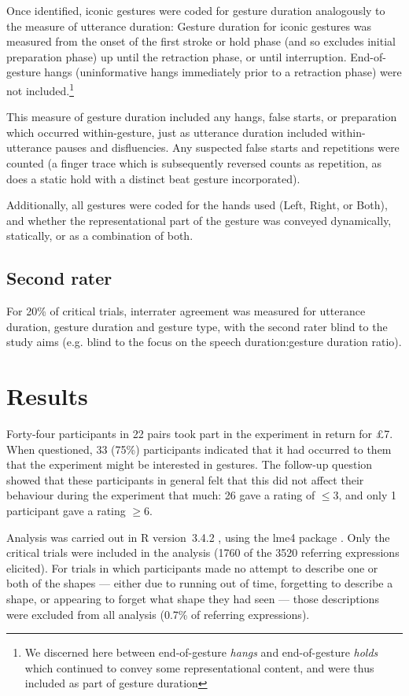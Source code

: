 \documentclass[a4paper,man,natbib]{apa6}
\newcommand*{\term}[1]{\emph{#1}} %
\begin{document}
Once identified, iconic gestures were coded for gesture duration analogously to the measure of utterance duration:
Gesture duration for iconic gestures was measured from the onset of the first stroke or hold phase (and so excludes initial preparation phase) up until the retraction phase, or until interruption.
End-of-gesture hangs (uninformative hangs immediately prior to a retraction phase) were not included.\footnote{We discerned here between end-of-gesture \term{hangs} and end-of-gesture \term{holds} which continued to convey some representational content, and were thus included as part of gesture duration}

This measure of gesture duration included any hangs, false starts, or preparation which occurred within-gesture, just as utterance duration included within-utterance pauses and disfluencies.
Any suspected false starts and repetitions were counted (a finger trace which is subsequently reversed counts as repetition, as does a static hold with a distinct beat gesture incorporated).

Additionally, all gestures were coded for the hands used (Left, Right, or Both), and whether the representational part of the gesture was conveyed dynamically, statically, or as a combination of both. 

\subsection{Second rater}
For 20\% of critical trials, interrater agreement was measured for utterance duration, gesture duration and gesture type, with the second rater blind to the study aims (e.g. blind to the focus on the speech duration:gesture duration ratio).

\section{Results}
Forty-four participants in 22 pairs took part in the experiment in return for \pounds{7}.
When questioned, 33 (75\%) participants indicated that it had occurred to them that the experiment might be interested in gestures.
The follow-up question showed that these participants in general felt that this did not affect their behaviour during the experiment that much: 26 gave a rating of $\leq$3, and only 1 participant gave a rating $\geq$6. 

Analysis was carried out in R version~3.4.2 \citep{rbase}, using the lme4 package \citep{lme4}.
Only the critical trials were included in the analysis (1760 of the 3520 referring expressions elicited).
For trials in which participants made no attempt to describe one or both of the shapes --- either due to running out of time, forgetting to describe a shape, or appearing to forget what shape they had seen --- those descriptions were excluded from all analysis (0.7\% of referring expressions).
\end{document}
